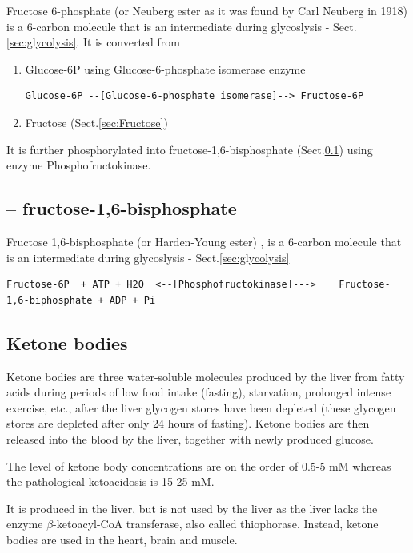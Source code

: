Fructose 6-phosphate (or Neuberg ester as it was found by Carl Neuberg in 1918)
is a 6-carbon molecule that is an intermediate during glycoslysis -
Sect.\ref{sec:glycolysis}. It is converted from 

\begin{enumerate}
  \item  Glucose-6P using Glucose-6-phosphate isomerase enzyme

{\tiny
\begin{verbatim}
Glucose-6P --[Glucose-6-phosphate isomerase]--> Fructose-6P
\end{verbatim}
}
  \item Fructose (Sect.\ref{sec:Fructose})
\end{enumerate}

It is further phosphorylated into fructose-1,6-bisphosphate
(Sect.\ref{sec:fructose-1,6-bisphosphate}) using enzyme Phosphofructokinase.

\subsection{-- fructose-1,6-bisphosphate}
\label{sec:fructose-1,6-bisphosphate}

Fructose 1,6-bisphosphate (or Harden-Young ester) , is a 6-carbon molecule that is an intermediate during glycoslysis -
Sect.\ref{sec:glycolysis}

{\tiny
\begin{verbatim}
Fructose-6P  + ATP + H2O  <--[Phosphofructokinase]--->    Fructose-1,6-biphosphate + ADP + Pi
\end{verbatim}
}



\subsection{Ketone bodies}
\label{sec:ketone-bodies}

Ketone bodies are three water-soluble molecules produced by the liver from fatty
acids during periods of low food intake (fasting), starvation, prolonged intense
exercise, etc., after the liver glycogen stores have been depleted (these
glycogen stores are depleted after only 24 hours of fasting).
Ketone bodies are then released into the blood by the liver, together with newly
produced glucose.


The level of ketone body concentrations are on the order of 0.5-5 mM whereas the
pathological ketoacidosis is 15-25 mM.

It is produced in the liver, but is not used by the liver as the liver lacks the
enzyme $\beta$-ketoacyl-CoA transferase, also called thiophorase. Instead,
ketone bodies are used in the heart, brain and muscle.


